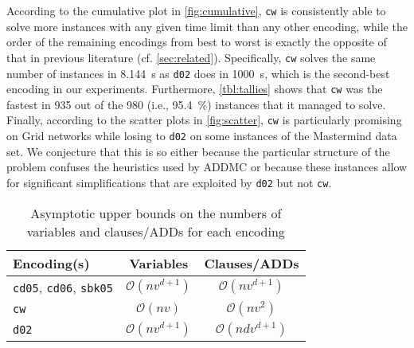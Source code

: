 \documentclass{article}
\begin{document}
\begin{figure*}
  \centering
  \caption{ADDMC inference time using \texttt{cw} compared to \texttt{d02}
    (left) and \texttt{sbk05} (right) for each instance in all data sets.}
  \label{fig:scatter}
\end{figure*}

According to the cumulative plot in \cref{fig:cumulative}, \texttt{cw} is
consistently able to solve more instances with any given time limit than any
other encoding, while the order of the remaining encodings from best to worst is
exactly the opposite of that in previous literature (cf. \cref{sec:related}).
Specifically, \texttt{cw} solves the same number of instances in
\SI{8.144}{\second} as \texttt{d02} does in \SI{1000}{\second}, which is the
second-best encoding in our experiments. Furthermore, \cref{tbl:tallies} shows
that \texttt{cw} was the fastest in 935 out of the 980 (i.e.,
\SI{95.4}{\percent}) instances that it managed to solve. Finally, according to
the scatter plots in \cref{fig:scatter}, \texttt{cw} is particularly promising
on Grid networks while losing to \texttt{d02} on some instances of the
Mastermind data set. We conjecture that this is so either because the particular
structure of the problem confuses the heuristics used by ADDMC or because these
instances allow for significant simplifications that are exploited by
\texttt{d02} but not \texttt{cw}.

\begin{table}
  \centering
  \begin{tabular}{lcc}
    \toprule
    Encoding(s) & Variables & Clauses/ADDs \\
    \midrule
    \texttt{cd05}, \texttt{cd06}, \texttt{sbk05} & $\mathcal{O}(nv^{d+1})$ & $\mathcal{O}(nv^{d+1})$ \\
    \texttt{cw} & $\mathcal{O}(nv)$ & $\mathcal{O}(nv^2)$ \\
    \texttt{d02} & $\mathcal{O}(nv^{d+1})$ & $\mathcal{O}(ndv^{d+1})$ \\
    \bottomrule
  \end{tabular}
  \caption{Asymptotic upper bounds on the numbers of variables and clauses/ADDs
    for each encoding}
  \label{tbl:asymptotes}
\end{table}
\end{document}

